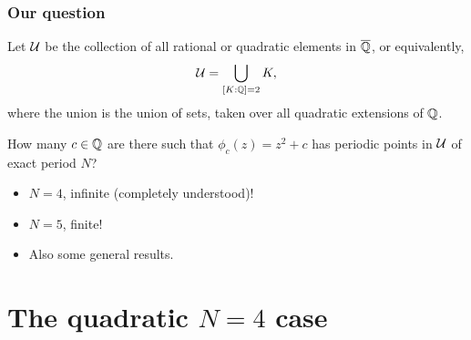 \documentclass[aspectratio=1610]{beamer}
\begin{document}
\begin{frame}
  \frametitle{Our question}

  \pause

  \begin{definition}
    Let $\mathcal{U}$ be the collection of all rational or quadratic elements
    in $\overline{\mathbb{Q}}$, or equivalently,
    \[
    \mathcal{U} = \bigcup_{[K : \mathbb{Q}] = 2}K,
    \]
    where the union is the union of sets, taken over all quadratic
    extensions of $\mathbb{Q}$.
  \end{definition}

  \pause

  \begin{question}
    \label{question}
    How many $c \in \mathbb{Q}$ are there such that $\phi_c(z) = z^2 + c$ has
    periodic points in $\mathcal{U}$ of exact period $N$?
  \end{question}

  \pause

  \begin{answer}
    \begin{itemize}
    \item $N = 4$, infinite (completely understood)!
    \item $N = 5$, finite!
    \item Also some general results.
    \end{itemize}
  \end{answer}
\end{frame}

\section{The quadratic $N = 4$ case}
\end{document}
